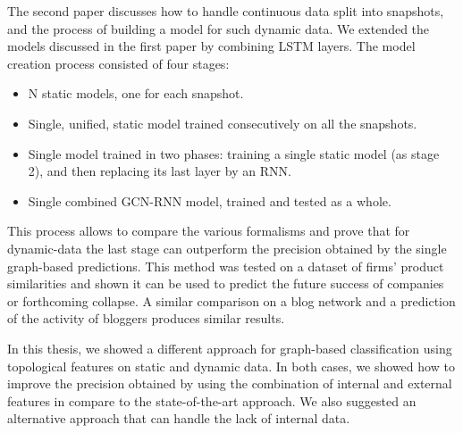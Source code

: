 {    The second paper discusses how to handle continuous data split into snapshots, and the process of building a model for such dynamic data. We extended the models discussed in the first paper by combining LSTM layers. The model creation process consisted of four stages:
    \begin{itemize}
        \item N static models, one for each snapshot.
        \item Single, unified, static model trained consecutively on all the snapshots.
        \item Single model trained in two phases: training a single static model (as stage 2), and then replacing its last layer by an RNN.
        \item Single combined GCN-RNN model, trained and tested as a whole.
    \end{itemize}
    This process allows to compare the various formalisms and prove that for dynamic-data the last stage can outperform the precision obtained by the single graph-based predictions. This method was tested on a dataset of firms' product similarities and shown it can be used to predict the future success of companies or forthcoming collapse. A similar comparison on a blog network and a prediction of the activity of bloggers produces similar results.
    
    In this thesis, we showed a different approach for graph-based classification using topological features on static and dynamic data. In both cases, we showed how to improve the precision obtained by using the combination of internal and external features in compare to the state-of-the-art approach. We also suggested an alternative approach that can handle the lack of internal data.
} %



